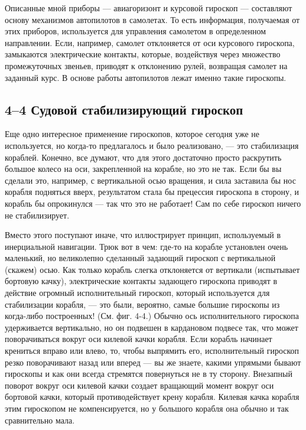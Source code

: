 \documentclass[11pt,oneside]{article}
\begin{document}
Описанные мной приборы --- авиагоризонт и курсовой гироскоп --- составляют основу механизмов автопилотов в самолетах. То есть информация, получаемая от этих приборов, используется для управления самолетом в определенном направлении. Если, например, самолет отклоняется от оси курсового гироскопа, замыкаются электрические контакты, которые, воздействуя через множество промежуточных звеньев, приводят к отклонению рулей, возвращая самолет на заданный курс. В основе работы автопилотов лежат именно такие гироскопы.\par

\subsection*{4--4 Судовой стабилизирующий гироскоп}

Еще одно интересное применение гироскопов, которое сегодня уже не используется, но когда-то предлагалось и было реализовано, --- это стабилизация кораблей. Конечно, все думают, что для этого достаточно просто раскрутить большое колесо на оси, закрепленной на корабле, но это не так. Если бы вы сделали это, например, с вертикальной осью вращения, и сила заставила бы нос корабля подняться вверх, результатом стала бы прецессия гироскопа в сторону, и корабль бы опрокинулся --- так что это не работает! Сам по себе гироскоп ничего не стабилизирует.\par

Вместо этого поступают иначе, что иллюстрирует принцип, используемый в инерциальной навигации. Трюк вот в чем: где-то на корабле установлен очень маленький, но великолепно сделанный задающий гироскоп с вертикальной (скажем) осью. Как только корабль слегка отклоняется от вертикали (испытывает бортовую качку), электрические контакты задающего гироскопа приводят в действие огромный исполнительный гироскоп, который используется для стабилизации корабля, --- это были, вероятно, самые большие гироскопы из когда-либо построенных! (См. фиг. 4-4.) Обычно ось исполнительного гироскопа удерживается вертикально, но он подвешен в кардановом подвесе так, что может поворачиваться вокруг оси килевой качки корабля. Если корабль начинает крениться вправо или влево, то, чтобы выпрямить его, исполнительный гироскоп резко поворачивают назад или вперед --- вы же знаете, какими упрямыми бывают гироскопы и как они всегда стремятся повернуться не в ту сторону. Внезапный поворот вокруг оси килевой качки создает вращающий момент вокруг оси бортовой качки, который противодействует крену корабля. Килевая качка корабля этим гироскопом не компенсируется, но у большого корабля она обычно и так сравнительно мала.\par
\end{document}
